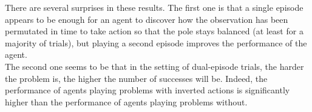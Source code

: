 There are several surprises in these results. The first one is that a single
episode appears to be enough for an agent to discover how the observation has
been permutated in time to take action so that the pole stays balanced (at least
for a majority of trials), but playing a second episode improves the performance
of the agent.\\

The second one seems to be that in the setting of dual-episode trials, the
harder the problem is, the higher the number of successes will be. Indeed,
the performance of agents playing problems with inverted actions is 
significantly higher than the performance of agents playing problems without.





